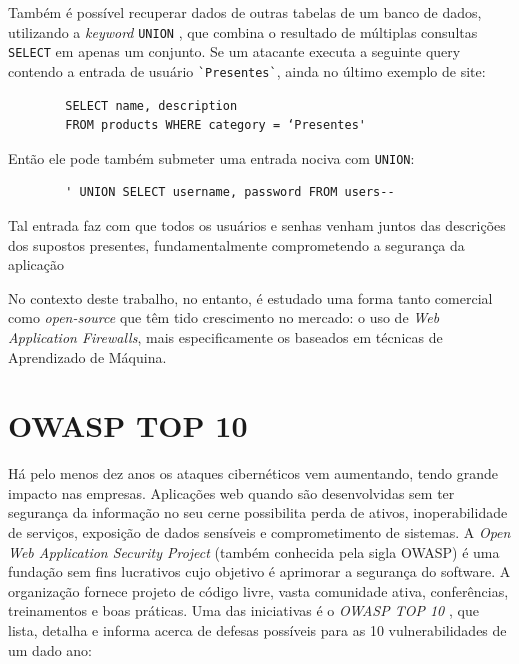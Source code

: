 \begin{alineas}
    \item
    Também é possível recuperar dados de outras tabelas de um banco de dados, utilizando a \textit{keyword} \verb+UNION+ \cite{mysql_union}, que combina o resultado de múltiplas consultas \verb+SELECT+ em apenas um conjunto. Se um atacante executa a seguinte query contendo a entrada de usuário \verb+`Presentes`+, ainda no último exemplo de site:
    
    \begin{verbatim}
        SELECT name, description
        FROM products WHERE category = ‘Presentes'
    \end{verbatim}
    
    Então ele pode também submeter uma entrada nociva com \verb+UNION+:
    
    \begin{verbatim}
        ' UNION SELECT username, password FROM users--
    \end{verbatim}
        
    Tal entrada faz com que todos os usuários e senhas venham juntos das descrições dos supostos presentes, fundamentalmente comprometendo a segurança da aplicação

\end{alineas}


No contexto deste trabalho, no entanto, é estudado uma forma tanto comercial como \textit{open-source}  que têm tido crescimento no mercado: o uso de \textit{Web Application Firewalls}, mais especificamente os baseados em técnicas de Aprendizado de Máquina.

\section{OWASP TOP 10}

Há pelo menos dez anos os ataques cibernéticos vem aumentando, tendo grande impacto nas empresas.
Aplicações web quando são desenvolvidas sem ter segurança da informação no seu cerne possibilita perda de ativos, inoperabilidade de serviços, exposição de dados sensíveis e comprometimento de sistemas. 
A \textit{Open Web Application Security Project} (também conhecida pela sigla OWASP) é uma fundação sem fins lucrativos cujo objetivo é aprimorar a segurança do software. A organização fornece projeto de código livre, vasta comunidade ativa, conferências, treinamentos e boas práticas. Uma das iniciativas é o \textit{OWASP TOP 10} \cite{bach_owasp2020understanding}, que lista, detalha e informa acerca de defesas possíveis para as 10 vulnerabilidades de um dado ano:

